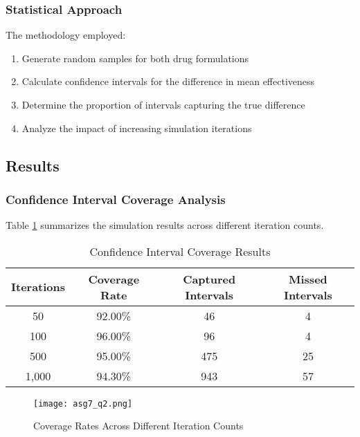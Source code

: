 \documentclass[12pt]{article}
\begin{document}
\subsubsection{Statistical Approach}
The methodology employed:
\begin{enumerate}
    \item Generate random samples for both drug formulations
    \item Calculate confidence intervals for the difference in mean effectiveness
    \item Determine the proportion of intervals capturing the true difference
    \item Analyze the impact of increasing simulation iterations
\end{enumerate}

\subsection{Results}

\subsubsection{Confidence Interval Coverage Analysis}
Table \ref{tab:coverage_results} summarizes the simulation results across different iteration counts.

\begin{table}[htbp]
    \centering
    \caption{Confidence Interval Coverage Results}
    \label{tab:coverage_results}
    \begin{tabular}{cccc}
        \hline
        Iterations & Coverage Rate & Captured Intervals & Missed Intervals \\
        \hline
        50 & 92.00\% & 46 & 4 \\
        100 & 96.00\% & 96 & 4 \\
        500 & 95.00\% & 475 & 25 \\
        1,000 & 94.30\% & 943 & 57 \\
        \hline
    \end{tabular}
\end{table}
\begin{figure}[H]
    \centering
    \texttt{[image: asg7\_q2.png]}
    \caption{Coverage Rates Across Different Iteration Counts}
    \label{fig:enter-label}
\end{figure}
\end{document}
